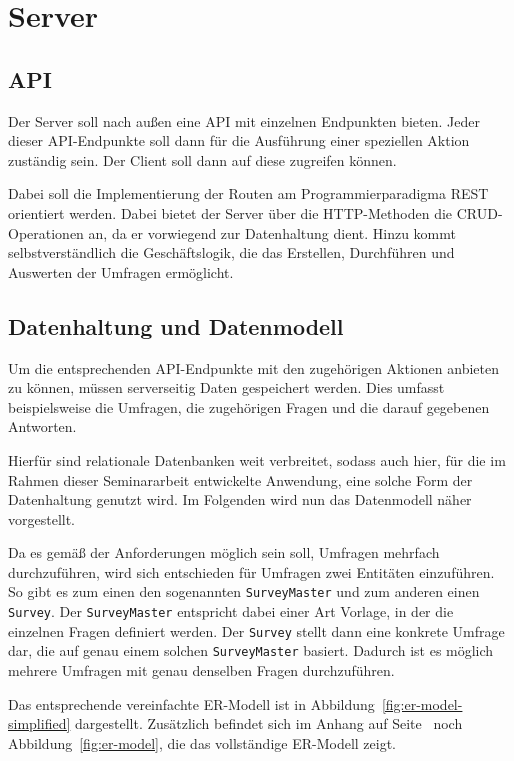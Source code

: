 \section{Server}

\subsection{\acl{API}}
Der Server soll nach außen eine \acs{API} mit einzelnen Endpunkten bieten.
Jeder dieser \acs{API}-Endpunkte soll dann für die Ausführung einer speziellen Aktion zuständig sein.
Der Client soll dann auf diese zugreifen können.

Dabei soll die Implementierung der Routen am Programmierparadigma \acs{REST} orientiert werden.
Dabei bietet der Server über die \acs{HTTP}-Methoden die \acs{CRUD}-Operationen an, da er vorwiegend zur Datenhaltung dient.
Hinzu kommt selbstverständlich die Geschäftslogik, die das Erstellen, Durchführen und Auswerten der Umfragen ermöglicht.

\subsection{Datenhaltung und Datenmodell}
Um die entsprechenden \acs{API}-Endpunkte mit den zugehörigen Aktionen anbieten zu können, müssen serverseitig Daten gespeichert werden.
Dies umfasst beispielsweise die Umfragen, die zugehörigen Fragen und die darauf gegebenen Antworten.

Hierfür sind relationale Datenbanken weit verbreitet, sodass auch hier, für die im Rahmen dieser Seminararbeit entwickelte Anwendung, eine solche Form der Datenhaltung genutzt wird.
Im Folgenden wird nun das Datenmodell näher vorgestellt.

Da es gemäß der Anforderungen möglich sein soll, Umfragen mehrfach durchzuführen, wird sich entschieden für Umfragen zwei Entitäten einzuführen.
So gibt es zum einen den sogenannten \texttt{SurveyMaster} und zum anderen einen \texttt{Survey}.
Der \texttt{SurveyMaster} entspricht dabei einer Art Vorlage, in der die einzelnen Fragen definiert werden.
Der \texttt{Survey} stellt dann eine konkrete Umfrage dar, die auf genau einem solchen \texttt{SurveyMaster} basiert.
Dadurch ist es möglich mehrere Umfragen mit genau denselben Fragen durchzuführen.

Das entsprechende vereinfachte \acs{ER-Modell} ist in Abbildung~\vref{fig:er-model-simplified} dargestellt.
Zusätzlich befindet sich im Anhang auf Seite~\pageref{fig:er-model} noch Abbildung~\ref{fig:er-model}, die das vollständige \acs{ER-Modell} zeigt.

